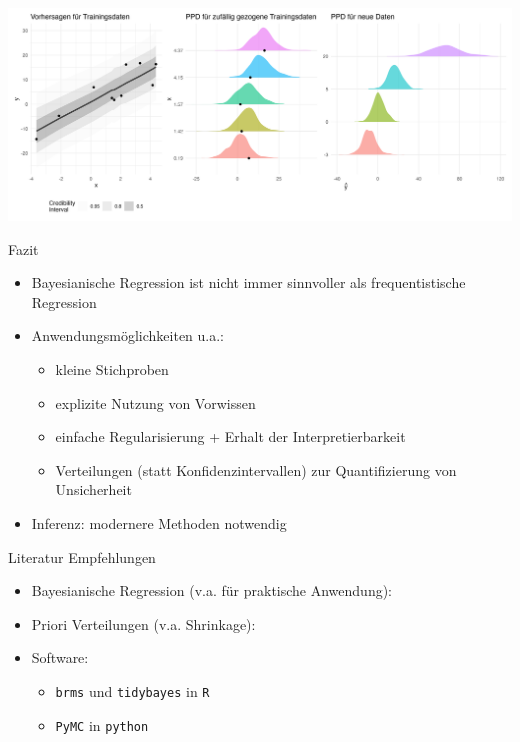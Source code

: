 \documentclass[
  ignorenonframetext,
  aspectratio=169,
]{beamer}
\providecommand{\tightlist}{%
  \setlength{\itemsep}{0pt}\setlength{\parskip}{0pt}}
\begin{document}
\begin{frame}
\includegraphics[width=\linewidth,height=0.8\textheight,keepaspectratio]{../figures/plot_ppd.png}
\end{frame}

\begin{frame}[fragile]
\begin{block}{Fazit}
\protect{}\label{fazit}
\begin{itemize}
\tightlist
\item
  Bayesianische Regression ist nicht immer sinnvoller als
  frequentistische Regression
\item
  Anwendungsmöglichkeiten u.a.:

  \begin{itemize}
  \tightlist
  \item
    kleine Stichproben
  \item
    explizite Nutzung von Vorwissen
  \item
    einfache Regularisierung + Erhalt der Interpretierbarkeit
  \item
    Verteilungen (statt Konfidenzintervallen) zur Quantifizierung von
    Unsicherheit
  \end{itemize}
\item
  Inferenz: modernere Methoden notwendig
\end{itemize}
\end{block}

\begin{block}{Literatur Empfehlungen}
\protect{}\label{literatur-empfehlungen}
\begin{itemize}
\tightlist
\item
  Bayesianische Regression (v.a. für praktische Anwendung):
  \textcite{gelman_bayesian_2013}
\item
  Priori Verteilungen (v.a. Shrinkage):
  \textcite{van_erp_shrinkage_2019}
\item
  Software:

  \begin{itemize}
  \tightlist
  \item
    \texttt{brms} und \texttt{tidybayes} in \texttt{R}
  \item
    \texttt{PyMC} in \texttt{python}
  \end{itemize}
\end{itemize}
\end{block}
\end{frame}
\end{document}
